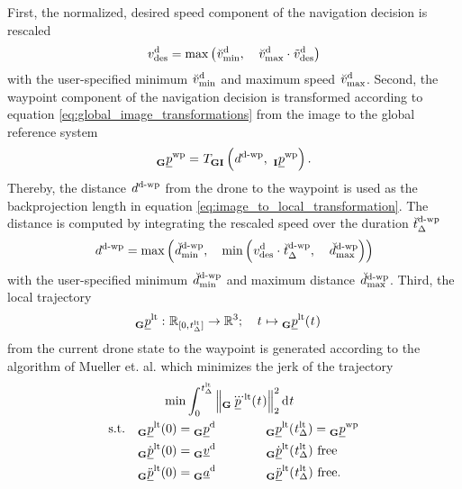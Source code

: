 First,
the normalized, desired speed component of the navigation decision is rescaled
\begin{equation}
    \speed[]{\drone}{\desired}{}{}
    = 
    \maxof{
        \speed[\user]{\drone}{\mnm}{}{}
    }{
        \speed[\user]{\drone}{\mxm}{}{}
        \cdot 
        \speed[\norm]{\drone}{\desired}{}{}
    }
\end{equation}
with the user-specified
minimum 
$
    \speed[\user]{\drone}{\mnm}{}{}
$
and
maximum speed
$
\speed[\user]{\drone}{\mxm}{}{}
$.
Second,
the waypoint component of the navigation decision
is transformed
according to equation \ref{eq:global_image_transformations}
from the image to the global reference system
\begin{equation}
    \pos[]{\wayp}{}{\grs}{}
    = 
    \trafo[]{}{\grs\irs}{}{} \left(
        \dist[]{\dronetowayp}{}{}{}
        ,\ 
        \pos[]{\wayp}{}{\irs}{}
    \right)
    .
\end{equation}
Thereby, the distance 
$
    \dist[]{\dronetowayp}{}{}{}
$
from the drone to the waypoint is
used as the backprojection length in equation \ref{eq:image_to_local_transformation}.
The distance is computed by integrating the rescaled speed over the 
duration
$
    \dur[\user]{\dronetowayp}{}{}{}
$
\begin{equation}
    \dist[]{\dronetowayp}{}{}{}
    = 
    \maxof{
        \dist[\user]{\dronetowayp}{\mnm}{}{}
    }{
        \minof{
            \speed[]{\drone}{\desired}{}{}
            \cdot
            \dur[\user]{\dronetowayp}{}{}{}
        }{
            \dist[\user]{\dronetowayp}{\mxm}{}{}
        }
    }
\end{equation}
with the user-specified minimum 
$
    \dist[\user]{\dronetowayp}{\mnm}{}{}
$
and
maximum distance
$
    \dist[\user]{\dronetowayp}{\mxm}{}{}
$.
Third,
the local trajectory
\begin{align}
    \pos[]{\loctraj}{}{\grs}{}%
    :\ 
    &\mathbb{R}_{[0, \dur[]{\loctraj}{}{}{}]} \rightarrow \mathbb{R}^3
    ;\quad
    \timepnt[]{}{}{}{}
    \mapsto
    \pos[]{\loctraj}{}{\grs}{}(\timepnt[]{}{}{}{})
\end{align}
from the current drone state to the waypoint
is generated according to
the algorithm of Mueller et. al. \cite{Mueller2013} which
minimizes the jerk of the trajectory
\begin{align}
    &\qquad \min 
    \int_0^{\dur[]{\loctraj}{}{}{}}
        \left\|
            \pos[\dddot]{\loctraj}{}{\grs}{}(\timepnt[]{}{}{}{})
        \right\|^2_2
    \text d \timepnt[]{}{}{}{}
    \nonumber \\
    \text{s.t.}\quad
    & \pos[]{\loctraj}{}{\grs}{}(0) = \pos[]{\drone}{}{\grs}{}
    \qquad\qquad \pos[]{\loctraj}{}{\grs}{}(\dur[]{\loctraj}{}{}{}) = \pos[]{\wayp}{}{\grs}{}
    \nonumber \\
    & \pos[\dot]{\loctraj}{}{\grs}{}(0) = \vel[]{\drone}{}{\grs}{}
    \qquad\qquad \pos[\dot]{\loctraj}{}{\grs}{}(\dur[]{\loctraj}{}{}{}) \text{ free}
    \nonumber \\
    & \pos[\ddot]{\loctraj}{}{\grs}{}(0) = \acc[]{\drone}{}{\grs}{}
    \qquad\qquad \pos[\ddot]{\loctraj}{}{\grs}{}(\dur[]{\loctraj}{}{}{}) \text{ free}
    .
\end{align}
